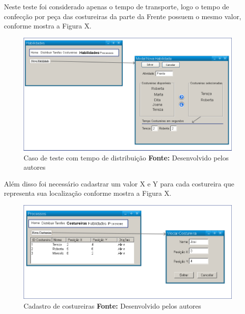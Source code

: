 \par Neste teste foi considerado apenas o tempo de transporte, logo o tempo de confecção por peça das costureiras da parte 
da Frente possuem o mesmo valor, conforme mostra a Figura X.


\begin{figure}[h!]
	\centerline{\includegraphics[scale=0.3]{./imagens/test_case_2_habilidades.png}}
	\caption[Caso de teste tempo]
	{Caso de teste com tempo de distribuição \textbf{Fonte:} Desenvolvido pelos autores}
	\label{fig:exemplo1}
\end{figure}

\newpage

\par Além disso foi necessário cadastrar um valor X e Y para cada costureira que representa sua localização conforme 
mostra a Figura X.


\begin{figure}[h!]
	\centerline{\includegraphics[scale=0.3]{./imagens/test_case_2_costureiras.png}}
	\caption[Caso de teste tempo Costureira]
	{Cadastro de costureiras \textbf{Fonte:} Desenvolvido pelos autores}
	\label{fig:exemplo1}
\end{figure}

